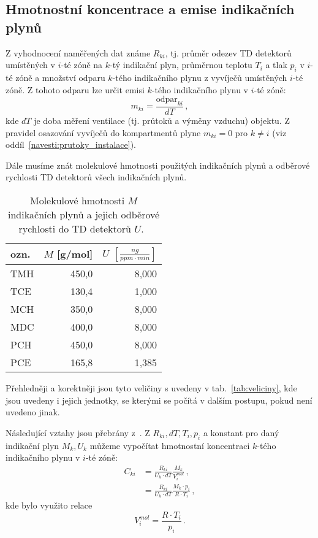 \subsection{Hmotnostní koncentrace a emise indikačních plynů}
Z vyhodnocení naměřených dat známe $R_{ki}$, tj. průměr odezev TD detektorů umístěných v $i$-té zóně na $k$-tý indikační plyn, průměrnou teplotu $T_i$ a tlak $p_i$ v $i$-té zóně a množství odparu $k$-tého indikačního plynu z vyvíječů umístěných $i$-té zóně. Z tohoto odparu lze určit emisi $k$-tého indikačního plynu v $i$-té zóně:
\begin{equation}
    m_{ki}=\frac{\text{odpar}_{ki}}{dT}\,,
    \label{eq:prutoky_emise}
\end{equation}
kde $dT$ je doba měření ventilace (tj. průtoků a výměny vzduchu) objektu. Z pravidel osazování vyvíječů do kompartmentů plyne $m_{ki}=0$ pro $k\neq i$ (viz oddíl~\ref{navesti:prutoky_instalace}). 

Dále musíme znát molekulové hmotnosti použitých indikačních plynů a odběrové rychlosti TD detektorů všech indikačních plynů.

\begin{table}[ht]
    \centering
    \caption{Molekulové hmotnosti $M$ indikačních plynů a jejich odběrové rychlosti do TD detektorů $U$.~\cite{metodika}}
    \label{tab:prutoky_plyny_konstanty}
    \begin{tabular}{lrr}
        \toprule
ozn. & $M$ [g/mol] & $U$ $\left[\si{\frac{ng}{ppm\cdot min}}\right]$\\
\midrule
TMH & 450,0 &  8,000 \\
TCE & 130,4 &  1,000 \\
MCH & 350,0 &  8,000 \\
MDC & 400,0 &  8,000 \\
PCH & 450,0 &  8,000 \\
PCE & 165,8 &  1,385 \\
\bottomrule
    \end{tabular}
\end{table}

Přehledněji a korektněji jsou tyto veličiny s uvedeny v tab.~\ref{tab:veliciny}, kde jsou uvedeny i jejich jednotky, se kterými se počítá v dalším postupu, pokud není uvedeno jinak.

Následující vztahy jsou přebrány z~\cite{metodika}. Z $R_{ki}, dT, T_i, p_i$ a konstant pro daný indikační plyn $M_k, U_k$ můžeme vypočítat hmotnostní koncentraci $k$-tého indikačního plynu v $i$-té zóně:
\begin{align}
    C_{ki}&=\frac{R_{ki}}{U_k\cdot dT}\frac{M_k}{V_{i}^{mol}}\,,\\
    &=\frac{R_{ki}}{U_k\cdot dT}\frac{M_k\cdot p_i}{R\cdot T_i}\,,
\end{align}
kde bylo využito relace
\begin{equation}
    V^{mol}_{i}=\frac{R\cdot T_i}{p_i}\,.
    \label{eq:prutoky_molarniObjem}
\end{equation}

